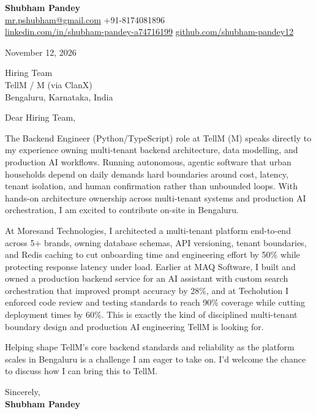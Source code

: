 \documentclass[a4paper,11pt]{article}
\begin{document}
\textbf{\Large Shubham Pandey}\\
\href{mailto:mr.pshubham@gmail.com}{mr.pshubham@gmail.com} \quad +91-8174081896\\
\href{https://www.linkedin.com/in/shubham-pandey-a74716199/}{linkedin.com/in/shubham-pandey-a74716199} \quad
\href{https://github.com/shubham-pandey12}{github.com/shubham-pandey12}

\vspace{1em}
November 12, 2026

\vspace{1em}
Hiring Team\\
TellM / M (via ClanX)\\
Bengaluru, Karnataka, India

\vspace{1em}
Dear Hiring Team,

The Backend Engineer (Python/TypeScript) role at TellM (M) speaks directly to my experience owning multi-tenant backend architecture, data modelling, and production AI workflows. Running autonomous, agentic software that urban households depend on daily demands hard boundaries around cost, latency, tenant isolation, and human confirmation rather than unbounded loops. With hands-on architecture ownership across multi-tenant systems and production AI orchestration, I am excited to contribute on-site in Bengaluru.

At Moresand Technologies, I architected a multi-tenant platform end-to-end across 5+ brands, owning database schemas, API versioning, tenant boundaries, and Redis caching to cut onboarding time and engineering effort by 50\% while protecting response latency under load. Earlier at MAQ Software, I built and owned a production backend service for an AI assistant with custom search orchestration that improved prompt accuracy by 28\%, and at Techolution I enforced code review and testing standards to reach 90\% coverage while cutting deployment times by 60\%. This is exactly the kind of disciplined multi-tenant boundary design and production AI engineering TellM is looking for.

Helping shape TellM's core backend standards and reliability as the platform scales in Bengaluru is a challenge I am eager to take on. I'd welcome the chance to discuss how I can bring this to TellM.

\vspace{1em}
Sincerely,\\[0.5em]
\textbf{Shubham Pandey}
\end{document}
